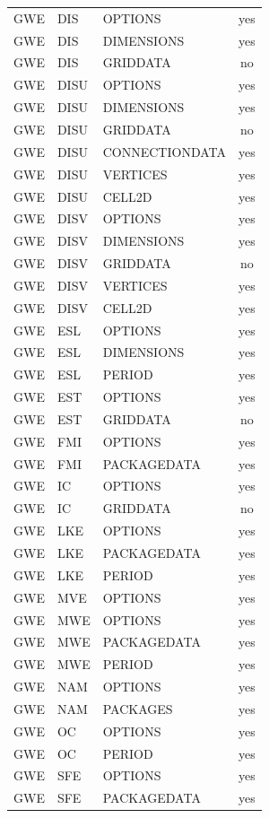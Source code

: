 \begin{longtable}{p{1.5cm} p{1.5cm} p{3cm} c}
\hline
GWE & DIS & OPTIONS & yes \\ 
GWE & DIS & DIMENSIONS & yes \\ 
GWE & DIS & GRIDDATA & no \\ 
\hline
GWE & DISU & OPTIONS & yes \\ 
GWE & DISU & DIMENSIONS & yes \\ 
GWE & DISU & GRIDDATA & no \\ 
GWE & DISU & CONNECTIONDATA & yes \\ 
GWE & DISU & VERTICES & yes \\ 
GWE & DISU & CELL2D & yes \\ 
\hline
GWE & DISV & OPTIONS & yes \\ 
GWE & DISV & DIMENSIONS & yes \\ 
GWE & DISV & GRIDDATA & no \\ 
GWE & DISV & VERTICES & yes \\ 
GWE & DISV & CELL2D & yes \\ 
\hline
GWE & ESL & OPTIONS & yes \\ 
GWE & ESL & DIMENSIONS & yes \\ 
GWE & ESL & PERIOD & yes \\ 
\hline
GWE & EST & OPTIONS & yes \\ 
GWE & EST & GRIDDATA & no \\ 
\hline
GWE & FMI & OPTIONS & yes \\ 
GWE & FMI & PACKAGEDATA & yes \\ 
\hline
GWE & IC & OPTIONS & yes \\ 
GWE & IC & GRIDDATA & no \\ 
\hline
GWE & LKE & OPTIONS & yes \\ 
GWE & LKE & PACKAGEDATA & yes \\ 
GWE & LKE & PERIOD & yes \\ 
\hline
GWE & MVE & OPTIONS & yes \\ 
\hline
GWE & MWE & OPTIONS & yes \\ 
GWE & MWE & PACKAGEDATA & yes \\ 
GWE & MWE & PERIOD & yes \\ 
\hline
GWE & NAM & OPTIONS & yes \\ 
GWE & NAM & PACKAGES & yes \\ 
\hline
GWE & OC & OPTIONS & yes \\ 
GWE & OC & PERIOD & yes \\ 
\hline
GWE & SFE & OPTIONS & yes \\ 
GWE & SFE & PACKAGEDATA & yes \\ 

\end{longtable}
